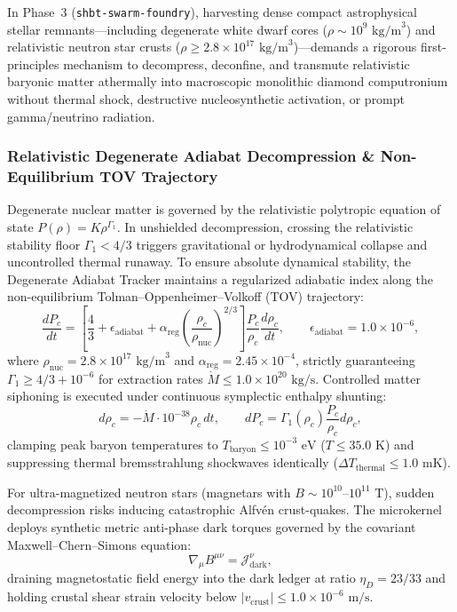 \documentclass[11pt,onecolumn]{article}
\begin{document}
In Phase~3 (\texttt{shbt-swarm-foundry}), harvesting dense compact astrophysical stellar remnants---including degenerate white dwarf cores ($\rho \sim 10^9\text{ kg/m}^3$) and relativistic neutron star crusts ($\rho \ge 2.8 \times 10^{17}\text{ kg/m}^3$)---demands a rigorous first-principles mechanism to decompress, deconfine, and transmute relativistic baryonic matter athermally into macroscopic monolithic diamond computronium without thermal shock, destructive nucleosynthetic activation, or prompt gamma/neutrino radiation.

\subsubsection{Relativistic Degenerate Adiabat Decompression \& Non-Equilibrium TOV Trajectory}
Degenerate nuclear matter is governed by the relativistic polytropic equation of state $P(\rho) = K \rho^{\Gamma_1}$. In unshielded decompression, crossing the relativistic stability floor $\Gamma_1 < 4/3$ triggers gravitational or hydrodynamical collapse and uncontrolled thermal runaway. To ensure absolute dynamical stability, the Degenerate Adiabat Tracker maintains a regularized adiabatic index along the non-equilibrium Tolman--Oppenheimer--Volkoff (TOV) trajectory:
\begin{equation}
\frac{dP_c}{dt} = \left[ \frac{4}{3} + \epsilon_{\text{adiabat}} + \alpha_{\text{reg}} \left( \frac{\rho_c}{\rho_{\text{nuc}}} \right)^{2/3} \right] \frac{P_c}{\rho_c} \frac{d\rho_c}{dt}, \qquad \epsilon_{\text{adiabat}} = 1.0 \times 10^{-6},
\label{eq:dense_adiabat_index}
\end{equation}
where $\rho_{\text{nuc}} = 2.8 \times 10^{17}\text{ kg/m}^3$ and $\alpha_{\text{reg}} = 2.45 \times 10^{-4}$, strictly guaranteeing $\Gamma_1 \ge 4/3 + 10^{-6}$ for extraction rates $\dot{M} \le 1.0 \times 10^{20}\text{ kg/s}$. Controlled matter siphoning is executed under continuous symplectic enthalpy shunting:
\begin{equation}
d\rho_c = -\dot{M} \cdot 10^{-38} \rho_c \, dt, \qquad dP_c = \Gamma_1(\rho_c) \frac{P_c}{\rho_c} d\rho_c,
\end{equation}
clamping peak baryon temperatures to $T_{\text{baryon}} \le 10^{-3}\text{ eV}$ ($T \le 35.0\text{ K}$) and suppressing thermal bremsstrahlung shockwaves identically ($\Delta T_{\text{thermal}} \le 1.0\text{ mK}$).

For ultra-magnetized neutron stars (magnetars with $B \sim 10^{10}\text{--}10^{11}\text{ T}$), sudden decompression risks inducing catastrophic Alfvén crust-quakes. The microkernel deploys synthetic metric anti-phase dark torques governed by the covariant Maxwell--Chern--Simons equation:
\begin{equation}
\nabla_\mu B^{\mu\nu} = \mathcal{J}_{\text{dark}}^\nu,
\label{eq:magnetar_dark_torque}
\end{equation}
draining magnetostatic field energy into the dark ledger at ratio $\eta_D = 23/33$ and holding crustal shear strain velocity below $|v_{\text{crust}}| \le 1.0 \times 10^{-6}\text{ m/s}$.
\end{document}
